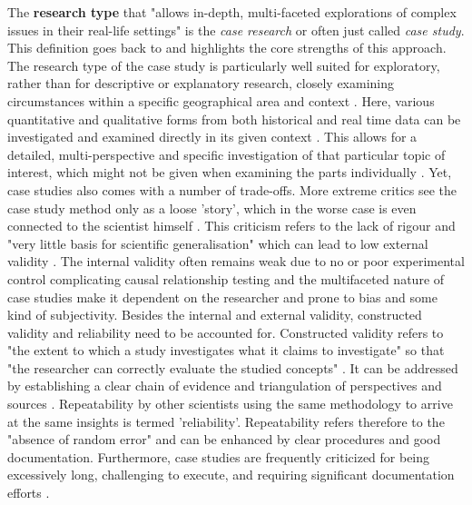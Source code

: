 The \textbf{research type} that "allows in-depth, multi-faceted explorations of complex issues in their real-life settings" \autocite[1]{croweCaseStudyApproach2011} is the \textit{case research} or often just called \textit{case study}. This definition goes back to \textcite{yinCaseStudyResearch1984} and highlights the core strengths of this approach. The research type of the case study is particularly well suited for exploratory, rather than for descriptive or explanatory research, closely examining circumstances within a specific geographical area and context \autocite{zainalCaseStudyResearch2007}. Here, various quantitative and qualitative forms from both historical and real time data can be investigated and examined directly in its given context \autocite{fitzgeraldCaseStudiesResearch1999}. This allows for a detailed, multi-perspective and specific investigation of that particular topic of interest, which might not be given when examining the parts individually \autocite{pelzResearchMethodsSocial, zainalCaseStudyResearch2007}. Yet, case studies also comes with a number of trade-offs.\newline
More extreme critics see the case study method only as a loose 'story', which in the worse case is even connected to the scientist himself \autocite{fitzgeraldCaseStudiesResearch1999}. This criticism refers to the lack of rigour and "very little basis for scientific generalisation" \autocite[5]{zainalCaseStudyResearch2007} which can lead to low external validity \autocites{yinCaseStudyResearch1984}. The internal validity often remains weak due to no or poor experimental control complicating causal relationship testing and the multifaceted nature of case studies make it dependent on the researcher and prone to bias and some kind of subjectivity. Besides the internal and external validity, constructed validity and reliability need to be accounted for. Constructed validity refers to "the extent to which a study investigates what it claims to investigate" \autocite[3]{gibbertWhatPassesRigorous2008} so that "the researcher can correctly evaluate the studied concepts" \autocite[277]{ferreiraHowImproveValidity2020}. It can be addressed by establishing a clear chain of evidence and triangulation of perspectives and sources \autocite{gibbertWhatPassesRigorous2008}. Repeatability by other scientists using the same methodology to arrive at the same insights is termed 'reliability'. Repeatability refers therefore to the "absence of random error" \autocite[5]{gibbertWhatPassesRigorous2008} and can be enhanced by clear procedures and good documentation. Furthermore, case studies are frequently criticized for being excessively long, challenging to execute, and requiring significant documentation efforts \autocite{yinCaseStudyResearch1984}.
